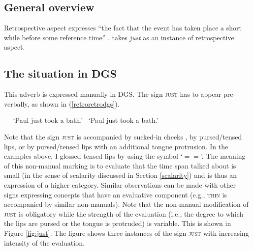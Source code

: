 \subsection{General overview}
Retrospective aspect expresses ``the fact that the event has taken place a short while before some reference time'' \citep[96]{cinque1999adverbs}. \citet{cinque1999adverbs} takes \textit{just} as an instance of retrospective aspect. 

\subsection{The situation in DGS}
This adverb is expressed manually in DGS. The sign \textsc{just} has to appear pre-verbally, as shown in (\ref{retroretrodgs}).


\begin{exe}

\ex\label{retroretrodgs}\begin{xlist} 
\ex \textcolor{white}{*}  
%
\glt \textcolor{white}{*}`Paul just took a bath.' \label{ex:retrospectivea}
\ex *  
%
\glt \textcolor{white}{*}`Paul just took a bath.' \label{ex:retrospectivea}
\end{xlist}
\end{exe} 


\noindent Note that the sign \textsc{just} is accompanied by sucked-in cheeks \citep[40]{herrmann2013modal}, by pursed/tensed lips, or by pursed/tensed lips with an additional tongue protrusion. In the examples above, I glossed tensed lips by using the symbol `$= =$'. The meaning of this non-manual marking is to evaluate that the time span talked about is small (in the sense of scalarity discussed in Section \ref{scalarity}) and is thus an expression of a higher category. Similar observations can be made with other signs expressing concepts that have an evaluative component (e.g., \textsc{thin} is accompanied by similar non-manuals). Note that the non-manual modification of \textsc{just} is obligatory while the strength of the evaluation (i.e., the degree to which the lips are pursed or the tongue is protruded) is variable. This is shown in Figure \ref{fig:just}. The figure shows three instances of the sign \textsc{just} with increasing intensity of the evaluation. 

